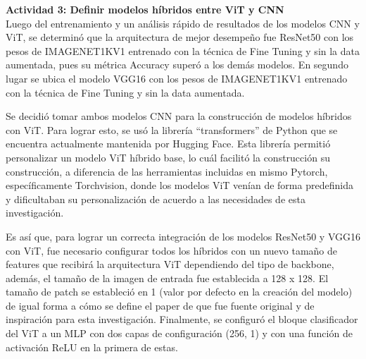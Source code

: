 \textbf{Actividad 3:  Definir modelos híbridos entre ViT y CNN}
\\
Luego del entrenamiento y un análisis rápido de resultados de los modelos CNN y ViT, se determinó que la arquitectura de mejor desempeño fue ResNet50 con los pesos de IMAGENET1KV1 entrenado con la técnica de Fine Tuning y sin la data aumentada, pues su métrica Accuracy superó a los demás modelos. En segundo lugar se ubica el modelo VGG16 con los pesos de IMAGENET1KV1 entrenado con la técnica de Fine Tuning y sin la data aumentada.

Se decidió tomar ambos modelos CNN para la construcción de modelos híbridos con ViT. Para lograr esto, se usó la librería “transformers” de Python que se encuentra actualmente mantenida por Hugging Face. Esta librería permitió personalizar un modelo ViT híbrido base, lo cuál facilitó la construcción su construcción, a diferencia de las herramientas incluidas en mismo Pytorch, específicamente Torchvision, donde los modelos ViT venían de forma predefinida y dificultaban su personalización de acuerdo a las necesidades de esta investigación.

Es así que, para lograr un correcta integración de los modelos ResNet50 y VGG16 con ViT, fue necesario configurar todos los híbridos con un nuevo tamaño de features que recibirá la arquitectura ViT dependiendo del tipo de backbone, además, el tamaño de la imagen de entrada fue establecida a 128 x 128. El tamaño de patch se estableció en 1 (valor por defecto en la creación del modelo) de igual forma a cómo se define el paper de \cite{pr_JERBI2023autoclassViTGAN} que fue fuente original y de inspiración para esta investigación. Finalmente, se configuró el bloque clasificador del ViT a un MLP con dos capas de configuración (256, 1) y con una función de activación ReLU en la primera de estas.

